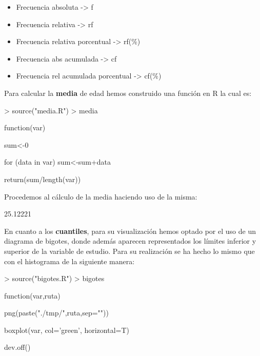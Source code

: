\documentclass [a4paper] {article}
\begin{document}
\begin{itemize}
\item Frecuencia absoluta -> f
\item Frecuencia relativa -> rf
\item Frecuencia relativa porcentual -> rf(\%)
\item Frecuencia abs acumulada -> cf
\item Frecuencia rel acumulada porcentual -> cf(\%)
\end{itemize}

\bigskip
Para calcular la \textbf{media} de edad hemos construido una funci\'on en R la cual es:
\begin{Schunk}
\begin{Sinput}
> source("media.R")
> media
\end{Sinput}
\begin{Soutput}
function(var) {
    sum<-0

    for (data in var) {
        sum<-sum+data
    }

    return(sum/length(var))
}
\end{Soutput}
\end{Schunk}

\bigskip
Procedemos al c\'alculo de la media haciendo uso de la misma:
\begin{Schunk}
\begin{Soutput}
[1] 25.12221
\end{Soutput}
\end{Schunk}

\bigskip
En cuanto a los \textbf{cuantiles}, para su visualizaci\'on hemos optado por el uso
de un diagrama de bigotes, donde adem\'as aparecen representados los l\'imites inferior
y superior de la variable de estudio. Para su realizaci\'on se ha hecho lo mismo que con el 
histograma de la siguiente manera:
\begin{Schunk}
\begin{Sinput}
> source("bigotes.R")
> bigotes
\end{Sinput}
\begin{Soutput}
function(var,ruta) {
    png(paste("./tmp/",ruta,sep=""))
 
    boxplot(var, col='green', horizontal=T) 

    dev.off()
}
\end{Soutput}
\end{Schunk}
\end{document}

